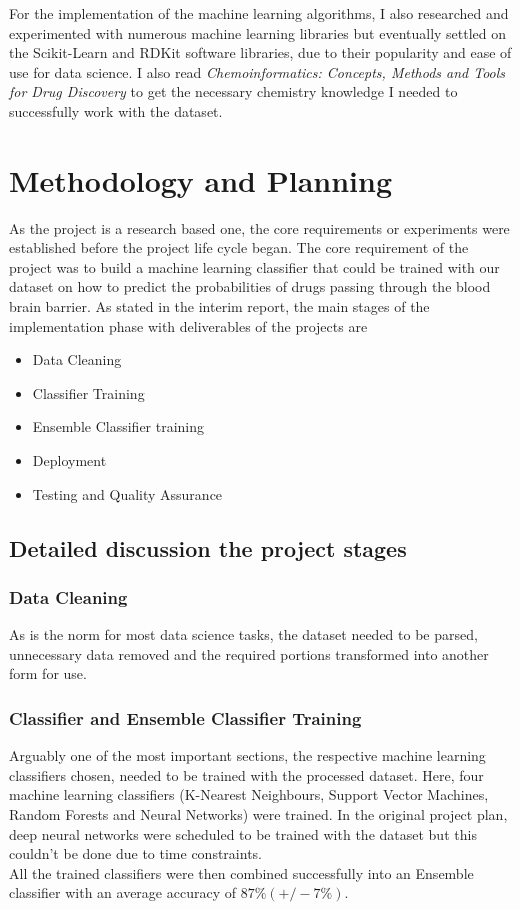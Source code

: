 \documentclass[a4paper,12pt]{article}
\begin{document}
	For the implementation of the machine learning algorithms, I also researched and experimented with numerous machine learning libraries but eventually settled on the Scikit-Learn and RDKit software libraries, due to their popularity and ease of use for data science. I also read \textit{Chemoinformatics: Concepts, Methods and Tools for Drug Discovery} to get the necessary chemistry knowledge I needed to successfully work with the dataset.
	
\section{Methodology and Planning}
	As the project is a research based one, the core requirements or experiments were established before the project life cycle began. The core requirement of the project was to build a machine learning classifier that could be trained with our dataset on how to predict the probabilities of drugs passing through the blood brain barrier. As stated in the interim report, the main stages of the implementation phase with deliverables of the projects are
		\begin{itemize}
			\item Data Cleaning
			\item Classifier Training
			\item Ensemble Classifier training
			\item Deployment 
			\item Testing and Quality Assurance
		\end{itemize}
	\subsection{Detailed discussion the project stages}
		\subsubsection{Data Cleaning}
		As is the norm for most data science tasks, the dataset needed to be parsed, unnecessary data removed and the required portions transformed into another form for use. 
		\subsubsection{Classifier and Ensemble Classifier Training}
		Arguably one of the most important sections, the respective machine learning classifiers chosen, needed to be trained with the processed dataset. Here, four machine learning classifiers (K-Nearest Neighbours, Support Vector Machines, Random Forests and Neural Networks) were trained. In the original project plan, deep neural networks were scheduled to be trained with the dataset but this couldn't be done due to time constraints.\\
		All the trained classifiers were then combined successfully into an Ensemble classifier with an average accuracy of $87\% (+/- 7\%)$.
\end{document}
